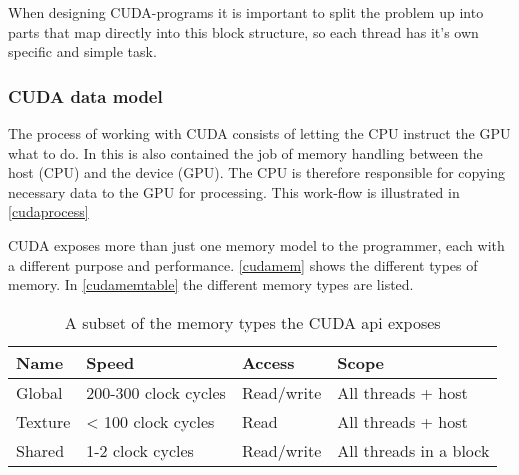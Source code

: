 \newpage
{}

When designing CUDA-programs it is important to split the problem up into parts that map directly into this block structure, so each thread has it's own specific and simple task.


\subsubsection{CUDA data model}
The process of working with CUDA consists of letting the CPU instruct the GPU what to do. In this is also contained the job of memory handling between the host (CPU) and the device (GPU). The CPU is therefore responsible for copying necessary data to the GPU for processing. This work-flow is illustrated in \autoref{cudaprocess}


CUDA exposes more than just one memory model to the programmer, each with a different purpose and performance. \autoref{cudamem} shows the different types of memory. In \autoref{cudamemtable} the different memory types are listed.

\begin{table}[htb]
	\centering
	\begin{tabular}{llll}
		\toprule
		Name 	& Speed & Access & Scope\\
		\midrule
		Global 	& 200-300 clock cycles 	& Read/write & All threads + host \\
		Texture 	& < 100 clock cycles & Read & All threads + host\\
		Shared 	& 1-2 clock cycles & Read/write & All threads in a block\\
		\bottomrule
	\end{tabular}
	\caption{A subset of the memory types the CUDA api exposes \cite{drdobbs}}
	\label{cudamemtable}
\end{table}

